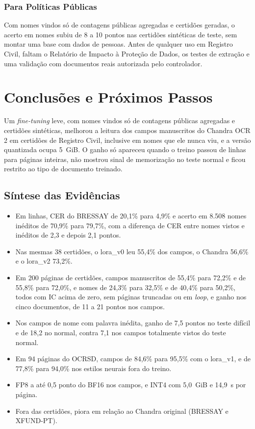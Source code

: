 \subsubsection{Para Políticas Públicas}
Com nomes vindos só de contagens públicas agregadas e certidões geradas, o acerto em nomes subiu de 8 a 10 pontos nas certidões sintéticas de teste, sem montar uma base com dados de pessoas. Antes de qualquer uso em Registro Civil, faltam o Relatório de Impacto à Proteção de Dados, os testes de extração e uma validação com documentos reais autorizada pelo controlador.

\section{Conclusões e Próximos Passos}
\label{sec:conclusoes}

Um \emph{fine-tuning} leve, com nomes vindos só de contagens públicas agregadas e certidões sintéticas, melhorou a leitura dos campos manuscritos do Chandra OCR 2 em certidões de Registro Civil, inclusive em nomes que ele nunca viu, e a versão quantizada ocupa 5~GiB. O ganho só apareceu quando o treino passou de linhas para páginas inteiras, não mostrou sinal de memorização no teste normal e ficou restrito ao tipo de documento treinado.

\subsection{Síntese das Evidências}

\begin{itemize}
    \item Em linhas, CER do BRESSAY de 20,1\% para 4,9\% e acerto em 8.508 nomes inéditos de 70,9\% para 79,7\%, com a diferença de CER entre nomes vistos e inéditos de 2,3 e depois 2,1 pontos.
    \item Nas mesmas 38 certidões, o lora\_v0 leu 55,4\% dos campos, o Chandra 56,6\% e o lora\_v2 73,2\%.
    \item Em 200 páginas de certidões, campos manuscritos de 55,4\% para 72,2\% e de 55,8\% para 72,0\%, e nomes de 24,3\% para 32,5\% e de 40,4\% para 50,2\%, todos com IC acima de zero, sem páginas truncadas ou em \emph{loop}, e ganho nos cinco documentos, de 11 a 21 pontos nos campos.
    \item Nos campos de nome com palavra inédita, ganho de 7,5 pontos no teste difícil e de 18,2 no normal, contra 7,1 nos campos totalmente vistos do teste normal.
    \item Em 94 páginas do OCRSD, campos de 84,6\% para 95,5\% com o lora\_v1, e de 77,8\% para 94,0\% nos estilos neurais fora do treino.
    \item FP8 a até 0,5 ponto do BF16 nos campos, e INT4 com 5,0~GiB e 14,9~s por página.
    \item Fora das certidões, piora em relação ao Chandra original (BRESSAY e XFUND-PT).
\end{itemize}

